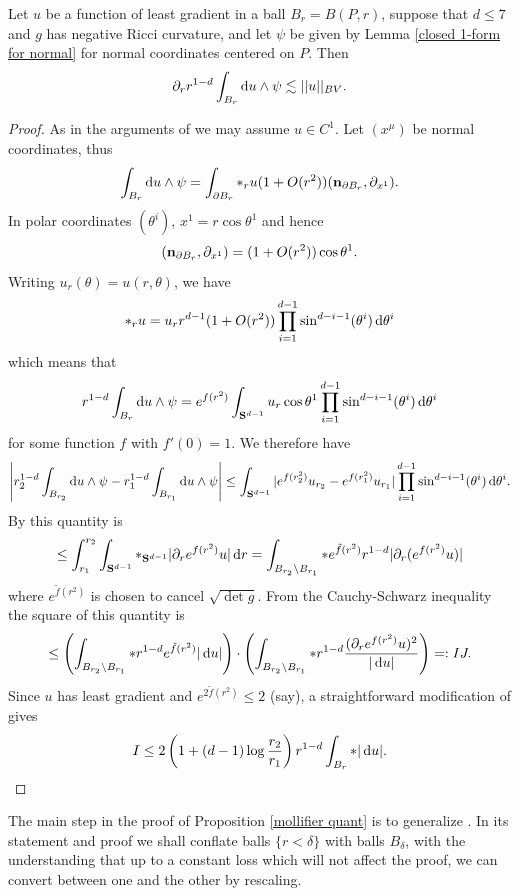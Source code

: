 \begin{lemma}\label{bounding the G}
Let $u$ be a function of least gradient in a ball $B_r = B(P, r)$, suppose that $d \leq 7$ and $g$ has negative Ricci curvature, and let $\psi$ be given by Lemma \ref{closed 1-form for normal} for normal coordinates centered on $P$. Then 
$$\partial_r r^{1 - d} \int_{B_r} \mathop{}\!\mathrm{d} u \wedge \psi \lesssim ||u||_{BV}.$$
\end{lemma}
\begin{proof}
As in the arguments of \cite[Chapter 5]{Giusti77} we may assume $u \in C^1$.
Let $(x^\mu)$ be normal coordinates, thus
$$\int_{B_r} \mathop{}\!\mathrm{d} u \wedge \psi = \int_{\partial B_r} *_r u(1 + O(r^2))(\mathbf n_{\partial B_r}, \partial_{x^1}).$$
In polar coordinates $(\theta^i)$, $x^1 = r \cos \theta^1$ and hence
$$(\mathbf n_{\partial B_r}, \partial_{x^1}) = (1 + O(r^2)) \cos \theta^1.$$
Writing $u_r(\theta) = u(r, \theta)$, we have
$$*_r u = u_r r^{d - 1}(1 + O(r^2)) \prod_{i=1}^{d - 1} \sin^{d - i - 1}(\theta^i) \mathop{}\!\mathrm{d} \theta^i$$
which means that 
$$r^{1 - d} \int_{B_r} \mathop{}\!\mathrm{d} u \wedge \psi = e^{f(r^2)} \int_{\mathbf S^{d - 1}} u_r \cos \theta^1 \prod_{i=1}^{d - 1} \sin^{d - i - 1}(\theta^i) \mathop{}\!\mathrm{d} \theta^i$$
for some function $f$ with $f'(0) = 1$.
We therefore have 
$$
\left|r_2^{1 - d} \int_{B_{r_2}} \mathop{}\!\mathrm{d} u \wedge \psi - r_1^{1 - d} \int_{B_{r_1}} \mathop{}\!\mathrm{d} u \wedge \psi \right| \leq \int_{\mathbf S^{d - 1}} |e^{f(r_2^2)} u_{r_2} - e^{f(r_1^2)} u_{r_1}| \prod_{i=1}^{d - 1} \sin^{d - i - 1}(\theta^i) \mathop{}\!\mathrm{d} \theta^i.$$
By \cite[Lemma 5.3]{Giusti77} this quantity is 
$$\leq \int_{r_1}^{r_2} \int_{\mathbf S^{d - 1}} *_{\mathbf S^{d - 1}} |\partial_r e^{f(r^2)}u| \mathop{}\!\mathrm{d} r = \int_{B_{r_2} \setminus B_{r_1}} *e^{\tilde f(r^2)}r^{1 - d}|\partial_r (e^{f(r^2)}u)|$$
where $e^{\tilde f(r^2)}$ is chosen to cancel $\sqrt{\det g}$. From the Cauchy-Schwarz inequality the square of this quantity is 
$$\leq \left(\int_{B_{r_2} \setminus B_{r_1}} *r^{1 - d}e^{\tilde f(r^2)} |\mathop{}\!\mathrm{d} u|\right) \cdot \left(\int_{B_{r_2} \setminus B_{r_1}} *r^{1 - d} \frac{(\partial_r e^{f(r^2)} u)^2}{|\mathop{}\!\mathrm{d} u|}\right) =: IJ.$$
Since $u$ has least gradient and $e^{2\tilde f(r^2)} \leq 2$ (say), a straightforward modification of \cite[Lemma 5.11]{Giusti77} gives 
$$I \leq 2\left(1 + (d - 1) \log \frac{r_2}{r_1}\right) r^{1 - d} \int_{B_r} *|\mathop{}\!\mathrm{d} u|.$$

\end{proof}

The main step in the proof of Proposition \ref{mollifier quant} is to generalize \cite[Theorem 7.3, Remark 7.4]{Giusti77}.
In its statement and proof we shall conflate balls $\{r < \delta\}$ with balls $B_\delta$, with the understanding that up to a constant loss which will not affect the proof, we can convert between one and the other by rescaling.

